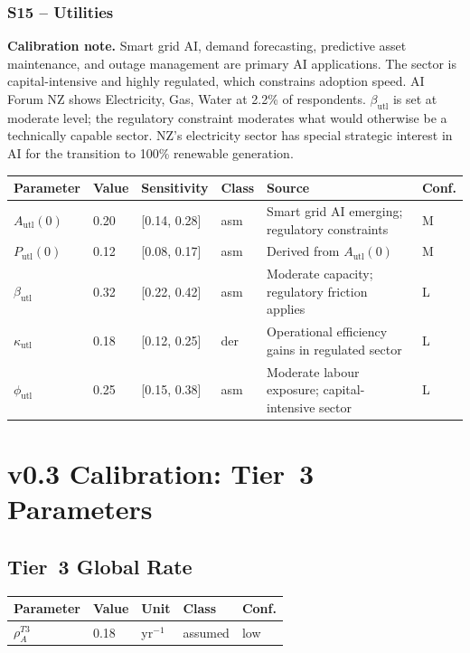 \documentclass[11pt,a4paper]{article}
\begin{document}
\subsubsection*{S15 -- Utilities}

\textbf{Calibration note.} Smart grid AI, demand forecasting, predictive asset maintenance, and outage management are primary AI applications. The sector is capital-intensive and highly regulated, which constrains adoption speed. AI Forum NZ shows Electricity, Gas, Water at 2.2\% of respondents. $\beta_{\text{utl}}$ is set at moderate level; the regulatory constraint moderates what would otherwise be a technically capable sector. NZ's electricity sector has special strategic interest in AI for the transition to 100\% renewable generation.

\begin{center}
\begin{tabular}{llllll}
\toprule
Parameter & Value & Sensitivity & Class & Source & Conf.\\
\midrule
$A_{\text{utl}}(0)$ & 0.20 & [0.14, 0.28] & asm & Smart grid AI emerging; regulatory constraints & M \\
$P_{\text{utl}}(0)$ & 0.12 & [0.08, 0.17] & asm & Derived from $A_{\text{utl}}(0)$ & M \\
$\beta_{\text{utl}}$ & 0.32 & [0.22, 0.42] & asm & Moderate capacity; regulatory friction applies & L \\
$\kappa_{\text{utl}}$ & 0.18 & [0.12, 0.25] & der & Operational efficiency gains in regulated sector & L \\
$\phi_{\text{utl}}$ & 0.25 & [0.15, 0.38] & asm & Moderate labour exposure; capital-intensive sector & L \\
\bottomrule
\end{tabular}
\end{center}

\section{v0.3 Calibration: Tier~3 Parameters}
\label{sec:cal_t3}

\subsection{Tier~3 Global Rate}

\begin{center}
\begin{tabular}{lllll}
\toprule
Parameter & Value & Unit & Class & Conf. \\
\midrule
$\rho_A^{T3}$ & 0.18 & yr$^{-1}$ & assumed & low \\
\bottomrule
\end{tabular}
\end{center}
\end{document}
